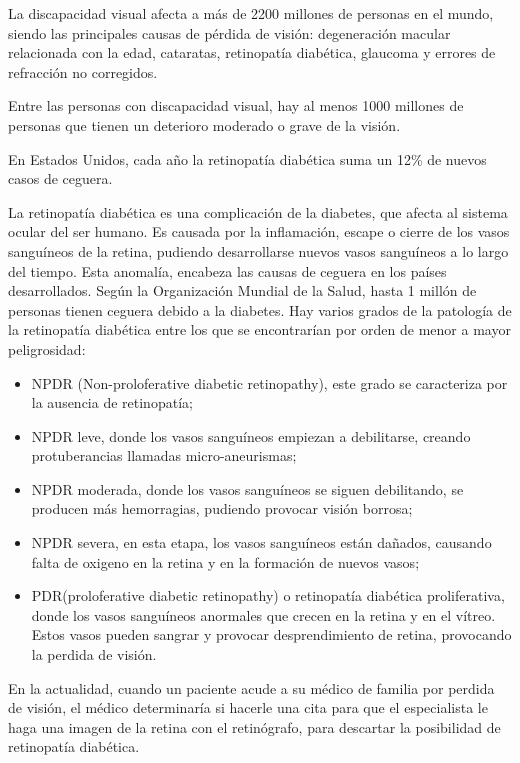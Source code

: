 
La discapacidad visual afecta a más de 2200 millones de personas en el mundo, siendo las principales causas de pérdida de visión: degeneración macular relacionada con la edad, cataratas, retinopatía diabética, glaucoma y errores de refracción no corregidos.\cite{oms-ceguera}


Entre las personas con discapacidad visual, hay al menos 1000 millones de personas que tienen un deterioro moderado o grave de la visión.\cite{oms-ceguera} 

En Estados Unidos, cada año la retinopatía diabética suma un 12\% de nuevos casos de ceguera.

La retinopatía diabética es una complicación de la diabetes, que afecta al sistema ocular del ser humano. Es causada por la inflamación, escape o cierre de los vasos sanguíneos de la retina, pudiendo desarrollarse nuevos vasos sanguíneos a lo largo del tiempo.\cite{enfermedad-ocular-diabetica} Esta anomalía, encabeza las causas de ceguera en los países desarrollados. Según la Organización Mundial de la Salud, hasta 1 millón de personas tienen ceguera debido a la diabetes. \cite{oms-diabetes}
Hay varios grados de la patología de la retinopatía diabética entre los que se encontrarían por orden de menor a mayor peligrosidad: 
\begin{itemize}
    \item NPDR (Non-proloferative diabetic retinopathy), este grado se caracteriza por la ausencia de retinopatía;
    \item NPDR leve, donde los vasos sanguíneos empiezan a debilitarse, creando protuberancias llamadas micro-aneurismas;
    \item  NPDR moderada, donde los vasos sanguíneos se siguen debilitando, se producen más hemorragias, pudiendo provocar visión borrosa;
    \item NPDR severa, en esta etapa, los vasos sanguíneos están dañados, causando falta de oxigeno en la retina y en la formación de nuevos vasos;
    \item PDR(proloferative diabetic retinopathy) o retinopatía diabética proliferativa, donde los vasos sanguíneos anormales que crecen en la retina y en el vítreo. Estos vasos pueden sangrar y provocar desprendimiento de retina, provocando la perdida de visión.
\end{itemize} 

\cite{grados-retinopatia}
En la actualidad, cuando un paciente acude a su médico de familia por perdida de visión, el médico determinaría si hacerle una cita para que el especialista le haga una imagen de la retina con el retinógrafo, para descartar la posibilidad de retinopatía diabética.

